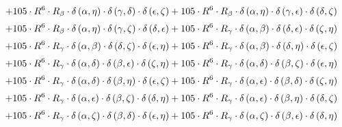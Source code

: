 \begin{subequations}
\begin{gather}
 \\[0.2em] \notag 		 + 105 \cdot R^{6} \cdot R_{\beta{}} \cdot \delta{}\left(\alpha{}, \eta{}\right) \cdot \delta{}\left(\gamma{}, \delta{}\right) \cdot \delta{}\left(\epsilon{}, \zeta{}\right)+ 105 \cdot R^{6} \cdot R_{\beta{}} \cdot \delta{}\left(\alpha{}, \eta{}\right) \cdot \delta{}\left(\gamma{}, \epsilon{}\right) \cdot \delta{}\left(\delta{}, \zeta{}\right) 
 \\[0.2em] \notag 		 + 105 \cdot R^{6} \cdot R_{\beta{}} \cdot \delta{}\left(\alpha{}, \eta{}\right) \cdot \delta{}\left(\gamma{}, \zeta{}\right) \cdot \delta{}\left(\delta{}, \epsilon{}\right)+ 105 \cdot R^{6} \cdot R_{\gamma{}} \cdot \delta{}\left(\alpha{}, \beta{}\right) \cdot \delta{}\left(\delta{}, \epsilon{}\right) \cdot \delta{}\left(\zeta{}, \eta{}\right) 
 \\[0.2em] \notag 		 + 105 \cdot R^{6} \cdot R_{\gamma{}} \cdot \delta{}\left(\alpha{}, \beta{}\right) \cdot \delta{}\left(\delta{}, \zeta{}\right) \cdot \delta{}\left(\epsilon{}, \eta{}\right)+ 105 \cdot R^{6} \cdot R_{\gamma{}} \cdot \delta{}\left(\alpha{}, \beta{}\right) \cdot \delta{}\left(\delta{}, \eta{}\right) \cdot \delta{}\left(\epsilon{}, \zeta{}\right) 
 \\[0.2em] \notag 		 + 105 \cdot R^{6} \cdot R_{\gamma{}} \cdot \delta{}\left(\alpha{}, \delta{}\right) \cdot \delta{}\left(\beta{}, \epsilon{}\right) \cdot \delta{}\left(\zeta{}, \eta{}\right)+ 105 \cdot R^{6} \cdot R_{\gamma{}} \cdot \delta{}\left(\alpha{}, \delta{}\right) \cdot \delta{}\left(\beta{}, \zeta{}\right) \cdot \delta{}\left(\epsilon{}, \eta{}\right) 
 \\[0.2em] \notag 		 + 105 \cdot R^{6} \cdot R_{\gamma{}} \cdot \delta{}\left(\alpha{}, \delta{}\right) \cdot \delta{}\left(\beta{}, \eta{}\right) \cdot \delta{}\left(\epsilon{}, \zeta{}\right)+ 105 \cdot R^{6} \cdot R_{\gamma{}} \cdot \delta{}\left(\alpha{}, \epsilon{}\right) \cdot \delta{}\left(\beta{}, \delta{}\right) \cdot \delta{}\left(\zeta{}, \eta{}\right) 
 \\[0.2em] \notag 		 + 105 \cdot R^{6} \cdot R_{\gamma{}} \cdot \delta{}\left(\alpha{}, \epsilon{}\right) \cdot \delta{}\left(\beta{}, \zeta{}\right) \cdot \delta{}\left(\delta{}, \eta{}\right)+ 105 \cdot R^{6} \cdot R_{\gamma{}} \cdot \delta{}\left(\alpha{}, \epsilon{}\right) \cdot \delta{}\left(\beta{}, \eta{}\right) \cdot \delta{}\left(\delta{}, \zeta{}\right) 
 \\[0.2em] \notag 		 + 105 \cdot R^{6} \cdot R_{\gamma{}} \cdot \delta{}\left(\alpha{}, \zeta{}\right) \cdot \delta{}\left(\beta{}, \delta{}\right) \cdot \delta{}\left(\epsilon{}, \eta{}\right)+ 105 \cdot R^{6} \cdot R_{\gamma{}} \cdot \delta{}\left(\alpha{}, \zeta{}\right) \cdot \delta{}\left(\beta{}, \epsilon{}\right) \cdot \delta{}\left(\delta{}, \eta{}\right) 

\end{gather}
\end{subequations}

